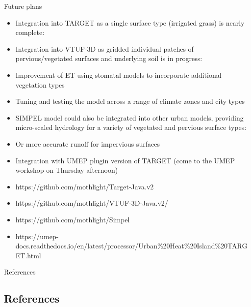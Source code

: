 \documentclass{beamer}
\begin{document}
\begin{frame}{Future plans} 

\begin{itemize}

\item Integration into TARGET as a single surface type (irrigated grass) is nearly complete:

\item Integration into VTUF-3D as gridded individual patches of pervious/vegetated surfaces and underlying soil is in progress: 

\item Improvement of ET using stomatal models to incorporate additional vegetation types

\item Tuning and testing the model across a range of climate zones and city types

\item SIMPEL model could also be integrated into other urban models, providing micro-scaled hydrology for a variety of vegetated and pervious surface types:

\item Or more accurate runoff for impervious surfaces

\item Integration with UMEP plugin version of TARGET (come to the UMEP workshop on Thursday afternoon)

\end{itemize}

\begin{itemize}
\setlength\itemsep{-0.55em}
\item[] {\tiny https://github.com/mothlight/Target-Java.v2}
\item[] {\tiny https://github.com/mothlight/VTUF-3D-Java.v2/} 
\item[] {\tiny https://github.com/mothlight/Simpel} 
\item[] {\tiny https://umep-docs.readthedocs.io/en/latest/processor/Urban\%20Heat\%20Island\%20TARGET.html}
\end{itemize}

\end{frame}




\begin{frame}[shrink=25]{References}
\begin{multicols}{2}
\section*{References}
%
%

\end{multicols}
\end{frame}
\end{document}
